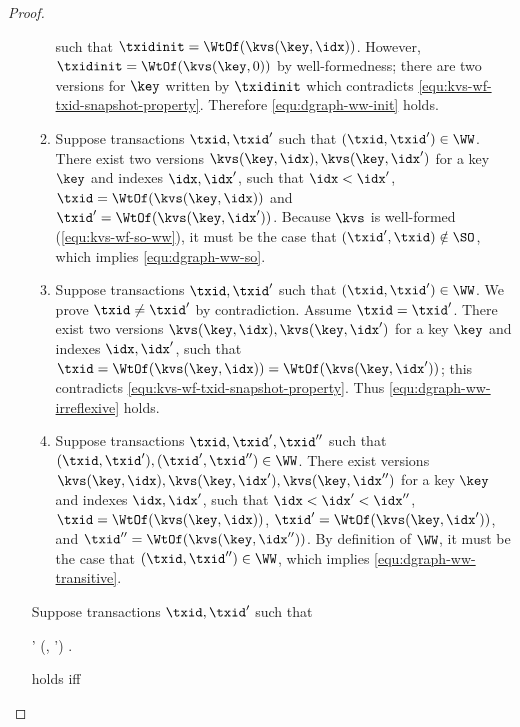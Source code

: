 \begin{toappendix}
\begin{proof}
\begin{enumerate}
\begin{enumerate}
        such that \( \txidinit = \WtOf(\kvs(\key,\idx))\).
        However, \( \txidinit = \WtOf(\kvs(\key,0)) \) by well-formedness;
        there are two versions for \( \key \) written by \( \txidinit \) 
        which contradicts \cref{equ:kvs-wf-txid-snapshot-property}.
        Therefore \cref{equ:dgraph-ww-init} holds.
    \item Suppose transactions \( \txid, \txid'\) such that \( (\txid, \txid') \in \WW \).
        There exist two versions \(\kvs(\key,\idx),\kvs(\key,\idx') \)
        for a key \( \key \) and indexes \( \idx,\idx' \), such that \( \idx < \idx' \),
        \( \txid = \WtOf(\kvs(\key,\idx))\) and \( \txid' = \WtOf(\kvs(\key,\idx'))\).
        Because \(\kvs\) is well-formed (\cref{equ:kvs-wf-so-ww}), 
        it must be the case that \((\txid',\txid) \notin \SO \),
        which implies \cref{equ:dgraph-ww-so}.
    \item Suppose transactions \( \txid, \txid'\) such that \( (\txid, \txid') \in \WW \).
        We prove \( \txid \neq \txid' \) by contradiction.
        Assume \( \txid = \txid' \).
        There exist two versions \(\kvs(\key,\idx),\kvs(\key,\idx') \)
        for a key \( \key \) and indexes \( \idx,\idx' \), such that
        \( \txid = \WtOf(\kvs(\key,\idx)) = \WtOf(\kvs(\key,\idx'))\);
        this contradicts \cref{equ:kvs-wf-txid-snapshot-property}.
        Thus \cref{equ:dgraph-ww-irreflexive} holds.
    \item Suppose transactions \( \txid, \txid', \txid''\) such that 
        \( (\txid, \txid'),(\txid', \txid'') \in \WW \).
        There exist versions \(\kvs(\key,\idx),\kvs(\key,\idx'),\kvs(\key,\idx'') \)
        for a key \( \key \) and indexes \( \idx,\idx' \), such that \( \idx < \idx' < \idx'' \),
        \( \txid = \WtOf(\kvs(\key,\idx))\), \( \txid' = \WtOf(\kvs(\key,\idx'))\),
        and \( \txid'' = \WtOf(\kvs(\key,\idx''))\).
        By definition of \( \WW \), it must be the case that \( (\txid, \txid'') \in \WW \),
        which implies \cref{equ:dgraph-ww-transitive}.
    \end{enumerate}
    Suppose transactions \( \txid, \txid'\) such that 
    \begin{Formulae}
    \begin{Formula}
    \txid \neq \txid' \land (\txid, \txid') \in \RW .
    \label{equ:kv-to-dgraph-rw-def}
    \end{Formula}
    \end{Formulae}
     holds iff 

\end{enumerate}
\end{proof}
\end{toappendix}
